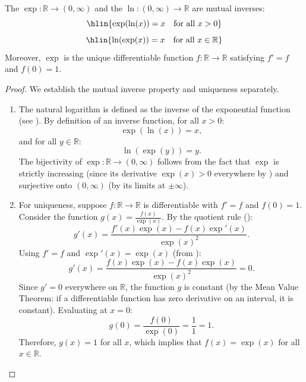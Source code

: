\begin{proposition} \label{proposition:real_exponential_and_real_natural_logarithm_functions_are_mutual_inverses}
The  $\exp : \mathbb{R} \to (0, \infty)$ and the  $\ln : (0, \infty) \to \mathbb{R}$ are mutual inverses:
$$\hlin{\exp(\ln(x)) = x \quad \text{for all } x > 0}$$
$$\hlin{\ln(\exp(x)) = x \quad \text{for all } x \in \mathbb{R}}$$
Moreover, $\exp$ is the unique differentiable function $f : \mathbb{R} \to \mathbb{R}$ satisfying $f' = f$ and $f(0) = 1$.
\end{proposition}
\begin{proof}
    We establish the mutual inverse property and uniqueness separately.

    \begin{enumerate}
        \item The natural logarithm is defined as the inverse of the exponential function (see ). By definition of an inverse function, for all $x > 0$:
        $$\exp(\ln(x)) = x,$$
        and for all $y \in \mathbb{R}$:
        $$\ln(\exp(y)) = y.$$
        The bijectivity of $\exp : \mathbb{R} \to (0, \infty)$ follows from the fact that $\exp$ is strictly increasing (since its derivative $\exp(x) > 0$ everywhere by ) and surjective onto $(0, \infty)$ (by its limits at $\pm\infty$).

        \item For uniqueness, suppose $f : \mathbb{R} \to \mathbb{R}$ is differentiable with $f' = f$ and $f(0) = 1$. Consider the function $g(x) = \frac{f(x)}{\exp(x)}$. By the quotient rule ():
        $$g'(x) = \frac{f'(x)\exp(x) - f(x)\exp'(x)}{\exp(x)^2}.$$
        Using $f' = f$ and $\exp'(x) = \exp(x)$ (from ):
        $$g'(x) = \frac{f(x)\exp(x) - f(x)\exp(x)}{\exp(x)^2} = 0.$$
        Since $g' = 0$ everywhere on $\mathbb{R}$, the function $g$ is constant (by the Mean Value Theorem: if a differentiable function has zero derivative on an interval, it is constant). Evaluating at $x = 0$:
        $$g(0) = \frac{f(0)}{\exp(0)} = \frac{1}{1} = 1.$$
        Therefore, $g(x) = 1$ for all $x$, which implies that $f(x) = \exp(x)$ for all $x \in \mathbb{R}$.
    \end{enumerate}
\end{proof}
